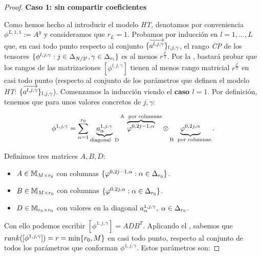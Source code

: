 \begin{proof}
    \textbf{Caso 1: sin compartir coeficientes}

    Como hemos hecho al introducir el modelo \textit{HT}, denotamos por conveniencia $\phi^{L, 1, 1}:= A^y$ y consideramos que $r_L = 1$. Probamos por inducción en $l = 1, \ldots, L$ que, en casi todo punto respecto al conjunto $\{ \overrightarrow{a^{l, j, \gamma}} \}_{l, j, \gamma}$, el rango \textit{CP} de los tensores $\{ \phi^{l, j, \gamma}: j \in \Delta_{N/2^l}, \gamma \in \Delta_{r_l} \}$ es al menos $r^{\frac{2^l}{2}}$. Por la , bastará probar que los rangos de las matrizaciones $[\phi^{l, j, \gamma}]$ tienen al menos rango matricial $r^{\frac{2^l}{2}}$ en casi todo punto (respecto al conjunto de los parámetros que definen el modelo \textit{HT}: $\{  \overrightarrow{a^{l, j, \gamma}} \}_{l, j, \gamma}$). Comenzamos la inducción viendo el \textbf{caso $l = 1$}. Por definición, tenemos que para unos valores concretos de $j, \gamma$:

    \begin{equation}
        \phi^{1, j, \gamma} = \sum_{\alpha = 1}^{r_0} \underbrace{a_{\alpha}^{1, j, \gamma}}_\textrm{\text{diagonal } D} \overbrace{\varphi^{0, 2j - 1, \alpha}}^\textrm{A \text{ por columnas}} \otimes \underbrace{\varphi^{0, 2j, \alpha}}_\textrm{B \text{ por columnas}}.
    \end{equation}

    Definimos tres matrices $A, B, D$:

    \begin{itemize}
        \item $A \in \mathbb{M}_{M \times r_0}$ con columnas $\{ \varphi^{0, 2j - 1, \alpha}: \alpha \in \Delta_{r_0} \}$.
        \item $B \in \mathbb{M}_{M \times r_0}$ con columnas $\{ \varphi^{0, 2j, \alpha}: \alpha \in \Delta_{r_0} \}$.
        \item $D \in \mathbb{M}_{r_0 \times r_0}$ con valores en la diagonal $a_{\alpha}^{1, j, \gamma}, \; \alpha \in \Delta_{r_0}$.
    \end{itemize}

    Con ello podemos escribir $[\phi^{1, j, \gamma}] = A D B^T$. Aplicando el , sabemos que $rank([\phi^{1, j, \gamma}]) = r = \min \{ r_0, M \}$ en casi todo punto, respecto al conjunto de todos los parámetros que conforman $\phi^{1, j, \gamma}$. Estos parámetros son:


\end{proof}
